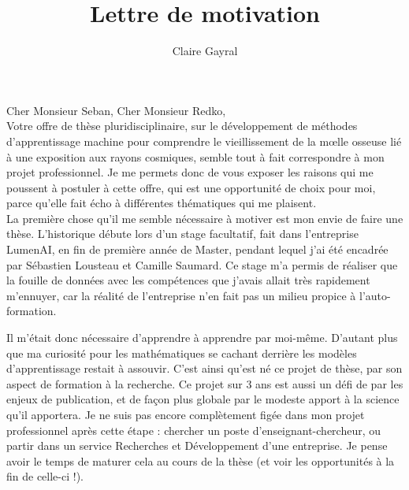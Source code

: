 \documentclass[a4paper,12pt]{article}
\title{Lettre de motivation}
\author{Claire Gayral}
\date{}
\begin{document}
\maketitle

Cher Monsieur Seban, Cher Monsieur Redko,\\

Votre offre de thèse pluridisciplinaire, sur le développement de méthodes d'apprentissage machine pour comprendre le vieillissement de la m\oe{}lle osseuse lié à une exposition aux rayons cosmiques, semble tout à fait correspondre à mon projet professionnel. Je me permets donc de vous exposer les raisons qui me poussent à postuler à cette offre, qui est une opportunité de choix pour moi, parce qu'elle fait écho à différentes thématiques qui me plaisent. \\

La première chose qu'il me semble nécessaire à motiver est mon envie de faire une thèse. L'historique débute lors d'un stage facultatif, fait dans l'entreprise LumenAI, en fin de première année de Master, pendant lequel j'ai été encadrée par Sébastien Lousteau et Camille Saumard. Ce stage m'a permis de réaliser que la fouille de données avec les compétences que j'avais allait très rapidement m'ennuyer, car la réalité de l'entreprise n'en fait pas un milieu propice à l'auto-formation. 

Il m'était donc nécessaire d'apprendre à apprendre par moi-même. D'autant plus que ma curiosité pour les mathématiques se cachant derrière les modèles d'apprentissage restait à assouvir.
C'est ainsi qu'est né ce projet de thèse, par son aspect de formation à la recherche. 
Ce projet sur 3 ans est aussi un défi de par les enjeux de publication, et de façon plus globale par le modeste apport à la science qu'il apportera. Je ne suis pas encore complètement figée dans mon projet professionnel après cette étape : chercher un poste d'enseignant-chercheur, ou partir dans un service Recherches et Développement d'une entreprise. Je pense avoir le temps de maturer cela au cours de la thèse (et voir les opportunités à la fin de celle-ci !). 
\end{document}
